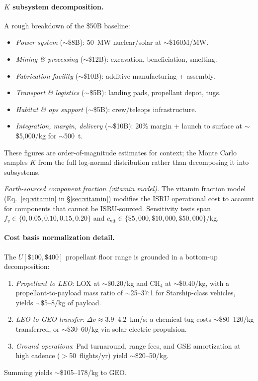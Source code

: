 \documentclass[preprint,12pt]{elsarticle}
\begin{document}
\paragraph{$K$ subsystem decomposition.} A rough breakdown of the \$50B baseline:
\begin{itemize}
  \item \emph{Power system} (${\sim}$\$8B): 50~MW nuclear/solar at ${\sim}$\$160M/MW.
  \item \emph{Mining \& processing} (${\sim}$\$12B): excavation, beneficiation, smelting.
  \item \emph{Fabrication facility} (${\sim}$\$10B): additive manufacturing + assembly.
  \item \emph{Transport \& logistics} (${\sim}$\$5B): landing pads, propellant depot, tugs.
  \item \emph{Habitat \& ops support} (${\sim}$\$5B): crew/teleops infrastructure.
  \item \emph{Integration, margin, delivery} (${\sim}$\$10B): 20\% margin + launch to surface at ${\sim}$\$5{,}000/kg for ${\sim}$500~t.
\end{itemize}
These figures are order-of-magnitude estimates for context; the Monte Carlo samples $K$ from the full log-normal distribution rather than decomposing it into subsystems.

\emph{Earth-sourced component fraction (vitamin model).} The vitamin fraction model (Eq.~\ref{eq:vitamin} in \S\ref{sec:vitamin}) modifies the ISRU operational cost to account for components that cannot be ISRU-sourced. Sensitivity tests span $f_v \in \{0, 0.05, 0.10, 0.15, 0.20\}$ and $c_{\mathrm{vit}} \in \{\$5{,}000, \$10{,}000, \$50{,}000\}$/kg.

\paragraph{Cost basis normalization detail.} The $U[\$100, \$400]$ propellant floor range is grounded in a bottom-up decomposition:
\begin{enumerate}
  \item \emph{Propellant to LEO}: LOX at $\sim$\$0.20/kg and CH$_4$ at $\sim$\$0.40/kg, with a propellant-to-payload mass ratio of $\sim$25--37:1 for Starship-class vehicles, yields $\sim$\$5--8/kg of payload.
  \item \emph{LEO-to-GEO transfer}: $\Delta v \approx 3.9$--$4.2$~km/s; a chemical tug costs $\sim$\$80--120/kg transferred, or $\sim$\$30--60/kg via solar electric propulsion.
  \item \emph{Ground operations}: Pad turnaround, range fees, and GSE amortization at high cadence ($>$50~flights/yr) yield $\sim$\$20--50/kg.
\end{enumerate}
Summing yields $\sim$\$105--178/kg to GEO.
\end{document}
